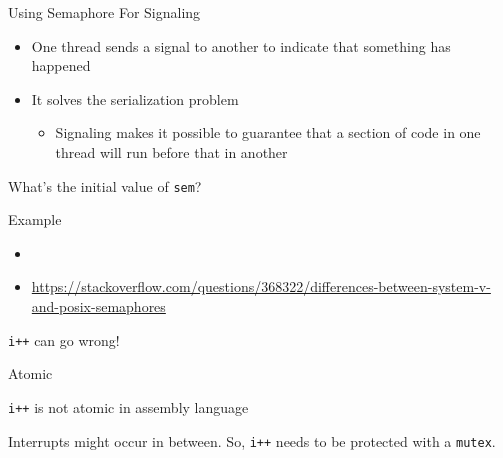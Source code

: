 \begin{frame}{Using Semaphore For Signaling}
  \begin{itemize}
  \item One thread sends a signal to another to indicate that something has
    happened
  \item It solves the serialization problem
    \begin{itemize}
    \item[] Signaling makes it possible to guarantee that a section of code in one thread
      will run before that in another
    \end{itemize}
  \end{itemize}
  \begin{center}
  \end{center}
  \begin{center}
    What's the initial value of \texttt{sem}?
  \end{center}
\end{frame}

\begin{frame}{Example}%
  \centering
\end{frame}

\begin{itemize}
\item {}
\item \url{https://stackoverflow.com/questions/368322/differences-between-system-v-and-posix-semaphores}
\end{itemize}

\begin{frame}{\texttt{i++} {\small can go wrong!}}
  \centering
\end{frame}

\begin{frame}{Atomic}
  \begin{iblock}{\texttt{i++} is not atomic in assembly language}
    \begin{center}
    \end{center}
  \end{iblock}
  Interrupts might occur in between. So, \texttt{i++} needs to be protected with a \texttt{mutex}.
\end{frame}

